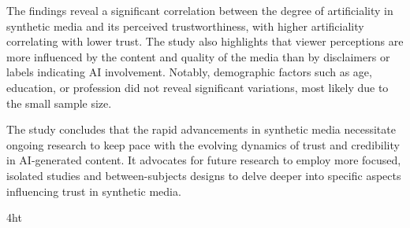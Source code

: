 \documentclass[
  a4paper,  %
  twoside,  %
  bibliography=totoc,
  headsepline,
  cleardoublepage=empty,
  parskip=half,
  draft=false
]{scrbook}
\begin{document}
The findings reveal a significant correlation between the degree of artificiality in synthetic media and its perceived trustworthiness, with higher artificiality correlating with lower trust. The study also highlights that viewer perceptions are more influenced by the content and quality of the media than by disclaimers or labels indicating AI involvement. Notably, demographic factors such as age, education, or profession did not reveal significant variations, most likely due to the small sample size.

The study concludes that the rapid advancements in synthetic media necessitate ongoing research to keep pace with the evolving dynamics of trust and credibility in AI-generated content. It advocates for future research to employ more focused, isolated studies and between-subjects designs to delve deeper into specific aspects influencing trust in synthetic media.

\cleardoublepage



\iftex4ht
\else
\fi

%
%

%
%
%
\tableofcontents


\listoffigures
\listoftables


\let\iflistings\iffalse
\iflistings
  \ifdeutsch
  \else
  \fi
\fi

\let\ifalgorithms\iffalse
\ifalgorithms
  \ifdeutsch
  \else
  \fi
\fi
\end{document}

